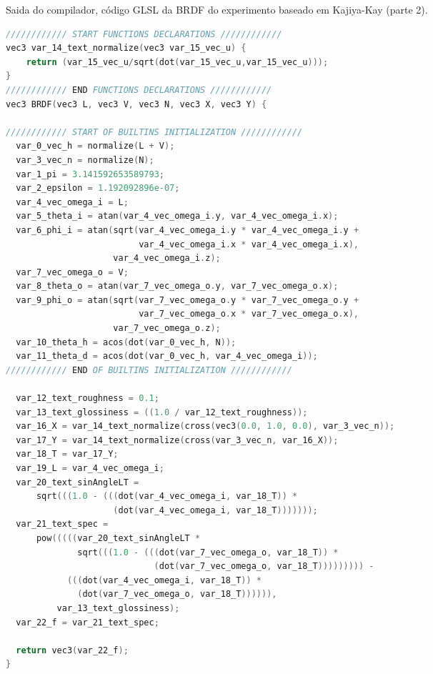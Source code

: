 \begin{codigo}[H]
    \caption{\small Saida do compilador, código GLSL da BRDF do experimento baseado em Kajiya-Kay (parte 2). }
    \label{cod-kajiya-eqlang}
\begin{lstlisting}[language=C, inputencoding=utf8]
//////////// START FUNCTIONS DECLARATIONS ////////////
vec3 var_14_text_normalize(vec3 var_15_vec_u) {
    return (var_15_vec_u/sqrt(dot(var_15_vec_u,var_15_vec_u)));
}
//////////// END FUNCTIONS DECLARATIONS ////////////
vec3 BRDF(vec3 L, vec3 V, vec3 N, vec3 X, vec3 Y) {

//////////// START OF BUILTINS INITIALIZATION ////////////
  var_0_vec_h = normalize(L + V);
  var_3_vec_n = normalize(N);
  var_1_pi = 3.141592653589793;
  var_2_epsilon = 1.192092896e-07;
  var_4_vec_omega_i = L;
  var_5_theta_i = atan(var_4_vec_omega_i.y, var_4_vec_omega_i.x);
  var_6_phi_i = atan(sqrt(var_4_vec_omega_i.y * var_4_vec_omega_i.y +
                          var_4_vec_omega_i.x * var_4_vec_omega_i.x),
                     var_4_vec_omega_i.z);
  var_7_vec_omega_o = V;
  var_8_theta_o = atan(var_7_vec_omega_o.y, var_7_vec_omega_o.x);
  var_9_phi_o = atan(sqrt(var_7_vec_omega_o.y * var_7_vec_omega_o.y +
                          var_7_vec_omega_o.x * var_7_vec_omega_o.x),
                     var_7_vec_omega_o.z);
  var_10_theta_h = acos(dot(var_0_vec_h, N));
  var_11_theta_d = acos(dot(var_0_vec_h, var_4_vec_omega_i));
//////////// END OF BUILTINS INITIALIZATION ////////////

  var_12_text_roughness = 0.1;
  var_13_text_glossiness = ((1.0 / var_12_text_roughness));
  var_16_X = var_14_text_normalize(cross(vec3(0.0, 1.0, 0.0), var_3_vec_n));
  var_17_Y = var_14_text_normalize(cross(var_3_vec_n, var_16_X));
  var_18_T = var_17_Y;
  var_19_L = var_4_vec_omega_i;
  var_20_text_sinAngleLT =
      sqrt(((1.0 - (((dot(var_4_vec_omega_i, var_18_T)) *
                     (dot(var_4_vec_omega_i, var_18_T)))))));
  var_21_text_spec =
      pow(((((var_20_text_sinAngleLT *
              sqrt(((1.0 - (((dot(var_7_vec_omega_o, var_18_T)) *
                             (dot(var_7_vec_omega_o, var_18_T))))))))) -
            (((dot(var_4_vec_omega_i, var_18_T)) *
              (dot(var_7_vec_omega_o, var_18_T)))))),
          var_13_text_glossiness);
  var_22_f = var_21_text_spec;

  return vec3(var_22_f);
}

\end{lstlisting}
\end{codigo}

